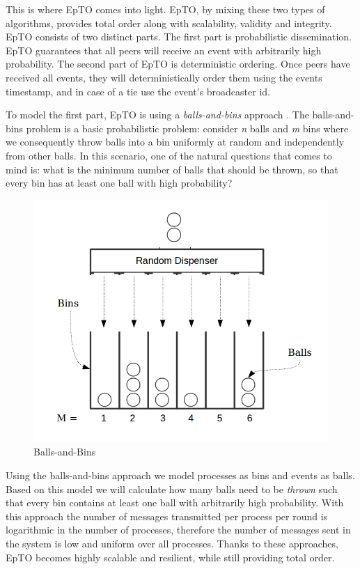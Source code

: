 \documentclass[10pt,conference,a4paper]{IEEEtran}
\begin{document}
This is where EpTO comes into light. EpTO, by mixing these two types of algorithms, provides total order along with scalability, validity and integrity. 
EpTO consists of two distinct parts. The first part is probabilistic dissemination. EpTO guarantees that all peers will receive an event with arbitrarily high probability. The second part of EpTO is deterministic ordering. Once peers have received all events, they will deterministically order them using the events timestamp, and in case of a tie use the event's broadcaster id.
\par
To model the first part, EpTO is using a \textit{balls-and-bins} approach \autocite{Koldehofe02simplegossiping}. The balls-and-bins problem is a basic probabilistic problem: consider \textit{n} balls and \textit{m} bins where we consequently throw balls into a bin uniformly at random and independently from other balls. In this scenario, one of the natural questions that comes to mind is: what is the minimum number of balls that should be thrown, so that every bin has at least one ball with high probability?
\begin{figure}
\includegraphics[width=\linewidth]{figures/BnB.jpeg}
\caption{Balls-and-Bins \autocite{bnb}}
\label{fig:balls-and-bins}
\end{figure}
\par
Using the balls-and-bins approach we model processes as bins and events as balls. Based on this model we will calculate how many balls need to be \textit{thrown} such that every bin contains at least one ball with arbitrarily high probability. With this approach the number of messages transmitted per process per round is logarithmic in the number of processes, therefore the number of messages sent in the system is low and uniform over all processes. Thanks to these approaches, EpTO becomes highly scalable and resilient, while still providing total order.
\end{document}
